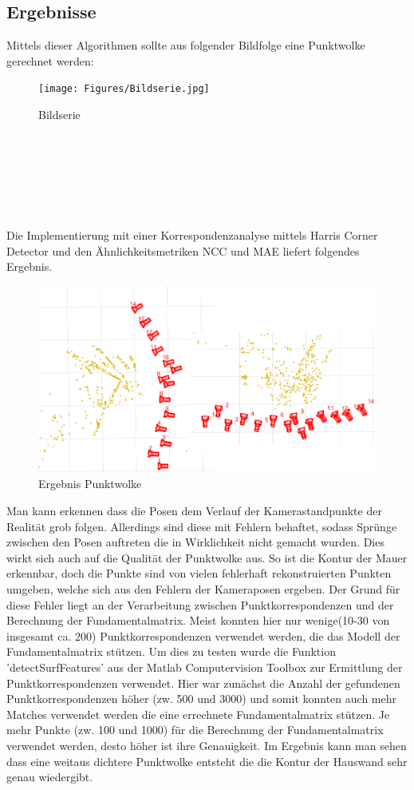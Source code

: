 \subsection{Ergebnisse}
Mittels dieser Algorithmen sollte aus folgender Bildfolge eine Punktwolke gerechnet werden:
\begin{figure}[ht]
    \centering
    \texttt{[image: Figures/Bildserie.jpg]}
    \caption{Bildserie}
\end{figure}
\\
\\
\\
\\
\\
\\
Die Implementierung mit einer Korrespondenzanalyse mittels Harris Corner Detector und den Ähnlichkeitsmetriken NCC und MAE liefert folgendes Ergebnis.
\begin{figure}[ht]
    \centering
    \includegraphics[scale=0.4]{Figures/ErgebnisZusammen2.png}
    \caption{Ergebnis Punktwolke}
\end{figure}
Man kann erkennen dass die Posen dem Verlauf der Kamerastandpunkte der Realität grob folgen. Allerdings sind diese mit Fehlern behaftet, sodass Sprünge zwischen den Posen auftreten die in Wirklichkeit nicht gemacht wurden. Dies wirkt sich auch auf die Qualität der Punktwolke aus. So ist die Kontur der Mauer erkennbar, doch die Punkte sind von vielen fehlerhaft rekonstruierten Punkten umgeben, welche sich aus den Fehlern der Kameraposen ergeben. Der Grund für diese Fehler liegt an der Verarbeitung zwischen Punktkorrespondenzen und der Berechnung der Fundamentalmatrix. Meist konnten hier nur wenige(10-30 von insgesamt ca. 200) Punktkorrespondenzen verwendet werden, die das Modell der Fundamentalmatrix stützen. Um dies zu testen 
wurde die Funktion 'detectSurfFeatures' aus der Matlab Computervision Toolbox zur Ermittlung der Punktkorrespondenzen verwendet. Hier war zunächst die Anzahl der gefundenen Punktkorrespondenzen höher (zw. 500 und 3000) und somit konnten auch mehr Matches verwendet werden die eine errechnete Fundamentalmatrix stützen. Je mehr Punkte (zw. 100 und 1000) für die Berechnung der Fundamentalmatrix verwendet werden, desto höher ist ihre Genauigkeit. Im Ergebnis kann man sehen dass eine weitaus dichtere Punktwolke entsteht die die Kontur der Hauswand sehr genau wiedergibt.

